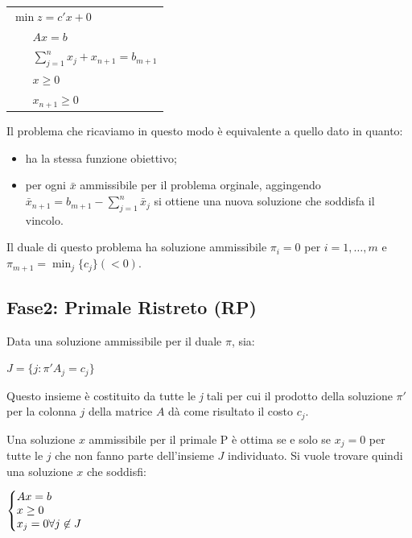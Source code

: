 \documentclass[11pt]{book}
\makeatletter
\newenvironment{sistema}%
{\left\lbrace\begin{array}{@{}l@{}}}%
{\end{array}\right.}
\makeatother
\begin{document}
\vspace{11pt}
\begin{center}
\begin{tabular}{l}
$\min z = c'x + 0$\\
$\phantom{min}Ax = b$\\
$\phantom{min}\sum\limits_{j=1}^n x_j + x_{n+1} = b_{m+1}$\\
$\phantom{min}x \geq 0$\\
$\phantom{min}x_{n+1} \geq 0$\\
\end{tabular}
\end{center}
\vspace{11pt}

Il problema che ricaviamo in questo modo \`e equivalente a quello dato
in quanto:

\begin{itemize}
\item ha la stessa funzione obiettivo;
\item per ogni $\bar{x}$ ammissibile per il problema orginale,
  aggingendo $\bar{x}_{n+1} = b_{m+1} - \sum\limits_{j=1}^n \bar{x}_j$
  si ottiene una nuova soluzione che soddisfa il vincolo.
\end{itemize}

Il duale di questo problema ha soluzione ammissibile $\pi_i = 0$ per
$i=1,\dots,m$ e $\pi_{m+1} = \min_j\{c_j\} (<0)$.


\subsection{Fase2: Primale Ristreto (RP)}

Data una soluzione ammissibile per il duale $\pi$, sia:

\begin{center}
$J = \{ j : \pi'A_j = c_j \}$
\end{center}

Questo insieme \`e costituito da tutte le {\em j} tali per cui il
prodotto della soluzione $\pi'$ per la colonna $j$ della matrice $A$
d\`a come risultato il costo $c_j$.

Una soluzione $x$ ammissibile per il primale P \`e ottima se e solo se
$x_j = 0$ per tutte le $j$ che non fanno parte dell'insieme $J$
individuato. Si vuole trovare quindi una soluzione $x$ che soddisfi:

\begin{center}
$\begin{sistema}
Ax = b\\
x \geq 0\\
x_j = 0 \forall j \not\in J
\end{sistema}$
\end{center}
\end{document}
